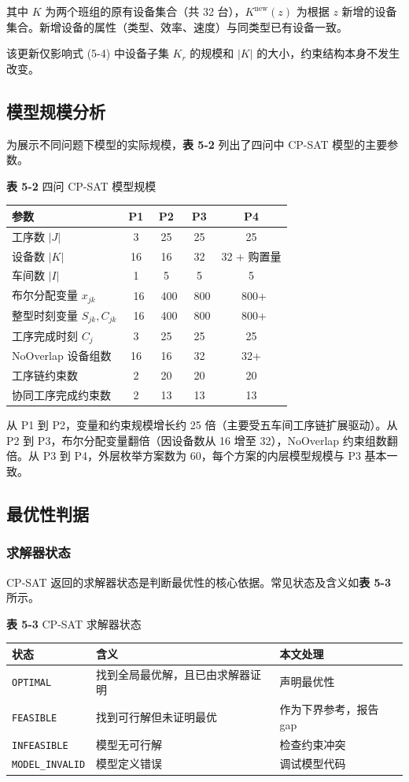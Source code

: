 \documentclass[UTF8,a4paper,12pt]{ctexart}
\begin{document}
其中 $K$ 为两个班组的原有设备集合（共 32 台），$K^{\text{new}}(z)$ 为根据 $z$ 新增的设备集合。新增设备的属性（类型、效率、速度）与同类型已有设备一致。

该更新仅影响式 (5-4) 中设备子集 $K_r$ 的规模和 $|K|$ 的大小，约束结构本身不发生改变。

\subsection{模型规模分析}
为展示不同问题下模型的实际规模，\textbf{表 5-2} 列出了四问中 CP-SAT 模型的主要参数。

\begin{center}
\textbf{表 5-2} 四问 CP-SAT 模型规模
\begin{tabular}{lcccc}
\toprule
参数 & P1 & P2 & P3 & P4 \\
\midrule
工序数 $|J|$ & 3 & 25 & 25 & 25 \\
设备数 $|K|$ & 16 & 16 & 32 & 32 + 购置量 \\
车间数 $|I|$ & 1 & 5 & 5 & 5 \\
布尔分配变量 $x_{jk}$ & ~16 & ~400 & ~800 & ~800+ \\
整型时刻变量 $S_{jk}, C_{jk}$ & ~16 & ~400 & ~800 & ~800+ \\
工序完成时刻 $C_j$ & 3 & 25 & 25 & 25 \\
NoOverlap 设备组数 & 16 & 16 & 32 & 32+ \\
工序链约束数 & 2 & 20 & 20 & 20 \\
协同工序完成约束数 & 2 & 13 & 13 & 13 \\
\bottomrule
\end{tabular}
\end{center}

从 P1 到 P2，变量和约束规模增长约 25 倍（主要受五车间工序链扩展驱动）。从 P2 到 P3，布尔分配变量翻倍（因设备数从 16 增至 32），NoOverlap 约束组数翻倍。从 P3 到 P4，外层枚举方案数为 60，每个方案的内层模型规模与 P3 基本一致。

\subsection{最优性判据}
\subsubsection{求解器状态}
CP-SAT 返回的求解器状态是判断最优性的核心依据。常见状态及含义如\textbf{表 5-3} 所示。

\begin{center}
\textbf{表 5-3} CP-SAT 求解器状态
\begin{tabular}{lll}
\toprule
状态 & 含义 & 本文处理 \\
\midrule
\texttt{OPTIMAL} & 找到全局最优解，且已由求解器证明 & 声明最优性 \\
\texttt{FEASIBLE} & 找到可行解但未证明最优 & 作为下界参考，报告 gap \\
\texttt{INFEASIBLE} & 模型无可行解 & 检查约束冲突 \\
\texttt{MODEL\_INVALID} & 模型定义错误 & 调试模型代码 \\
\bottomrule
\end{tabular}
\end{center}
\end{document}
